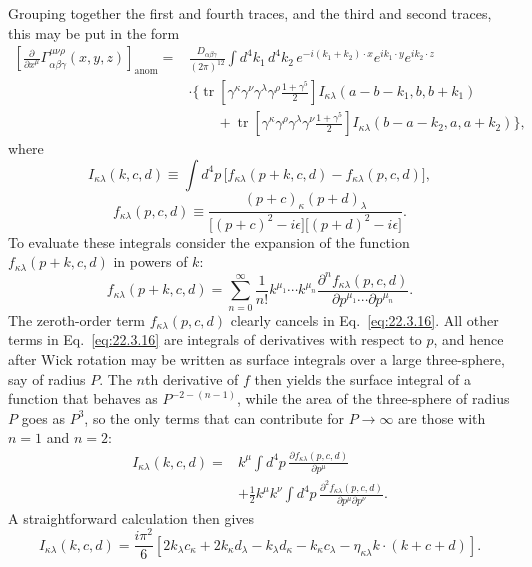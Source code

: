 Grouping together the first and fourth traces, and the third and second
traces, this may be put in the form
\begin{equation}
 \begin{aligned}
 \left[
  \frac{\partial}{\partial x^\mu}
  \Gamma_{\alpha\beta\gamma}^{\mu\nu\rho}(x,y,z)
 \right]_{\mathrm{anom}}
 ={}&\frac{D_{\alpha\beta\gamma}}{(2\pi)^{12}}
 \int d^4k_1\,d^4k_2\,
 e^{-i(k_1+k_2)\cdot x}e^{ik_1\cdot y}e^{ik_2\cdot z}
 \\
 &\cdot\Biggl\{
 \operatorname{tr}\!\left[
  \gamma^\kappa\gamma^\nu\gamma^\lambda\gamma^\rho
  \frac{1+\gamma^5}{2}
 \right]
 I_{\kappa\lambda}(a-b-k_1,b,b+k_1)
 \\
 &\qquad+
 \operatorname{tr}\!\left[
  \gamma^\kappa\gamma^\rho\gamma^\lambda\gamma^\nu
  \frac{1+\gamma^5}{2}
 \right]
 I_{\kappa\lambda}(b-a-k_2,a,a+k_2)
 \Biggr\},
 \end{aligned}
 \tag{22.3.15}\label{eq:22.3.15}
\end{equation}
where
\begin{equation}
 I_{\kappa\lambda}(k,c,d)
 \equiv\int d^4p\,
 \bigl[
  f_{\kappa\lambda}(p+k,c,d)-f_{\kappa\lambda}(p,c,d)
 \bigr],
 \tag{22.3.16}\label{eq:22.3.16}
\end{equation}
\begin{equation}
 f_{\kappa\lambda}(p,c,d)
 \equiv
 \frac{(p+c)_\kappa(p+d)_\lambda}
 {\bigl[(p+c)^2-i\epsilon\bigr]\bigl[(p+d)^2-i\epsilon\bigr]}.
 \tag{22.3.17}\label{eq:22.3.17}
\end{equation}
To evaluate these integrals consider the expansion of the function
$f_{\kappa\lambda}(p+k,c,d)$ in powers of $k$:
\[
 f_{\kappa\lambda}(p+k,c,d)
 =\sum_{n=0}^{\infty}\frac{1}{n!}
 k^{\mu_1}\cdots k^{\mu_n}
 \frac{\partial^n f_{\kappa\lambda}(p,c,d)}
 {\partial p^{\mu_1}\cdots\partial p^{\mu_n}}.
\]
The zeroth-order term $f_{\kappa\lambda}(p,c,d)$ clearly cancels in
Eq.~\eqref{eq:22.3.16}. All other terms in Eq.~\eqref{eq:22.3.16} are
integrals of derivatives with respect to $p$, and hence after Wick rotation
may be written as surface integrals over a large three-sphere, say of radius
$P$. The $n$th derivative of $f$ then yields the surface integral of a
function that behaves as $P^{-2-(n-1)}$, while the area of the three-sphere
of radius $P$ goes as $P^3$, so the only terms that can contribute for
$P\to\infty$ are those with $n=1$ and $n=2$:
\begin{equation}
 \begin{aligned}
 I_{\kappa\lambda}(k,c,d)
 ={}&k^\mu\int d^4p\,
 \frac{\partial f_{\kappa\lambda}(p,c,d)}{\partial p^\mu}
 \\
 &+\frac12k^\mu k^\nu\int d^4p\,
 \frac{\partial^2 f_{\kappa\lambda}(p,c,d)}
 {\partial p^\mu\partial p^\nu}.
 \end{aligned}
 \tag{22.3.18}\label{eq:22.3.18}
\end{equation}
A straightforward calculation then gives
\begin{equation}
 I_{\kappa\lambda}(k,c,d)
 =\frac{i\pi^2}{6}
 \left[
  2k_\lambda c_\kappa+2k_\kappa d_\lambda
  -k_\lambda d_\kappa-k_\kappa c_\lambda
  -\eta_{\kappa\lambda}k\cdot(k+c+d)
 \right].
 \tag{22.3.19}\label{eq:22.3.19}
\end{equation}

